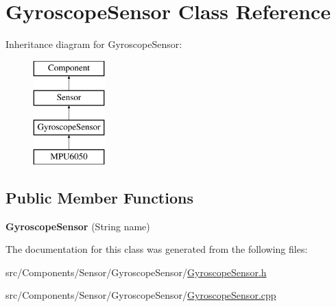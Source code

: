 \hypertarget{classGyroscopeSensor}{}\section{Gyroscope\+Sensor Class Reference}
\label{classGyroscopeSensor}
Inheritance diagram for Gyroscope\+Sensor\+:\begin{figure}[H]
\begin{center}
\leavevmode
\includegraphics[height=4.000000cm]{classGyroscopeSensor}
\end{center}
\end{figure}
\subsection*{Public Member Functions}
\begin{DoxyCompactItemize}
\item 
\hypertarget{classGyroscopeSensor_a5e0f1b0f3aecb4078fca1067055c0a7b}{}{\bfseries Gyroscope\+Sensor} (String name)\label{classGyroscopeSensor_a5e0f1b0f3aecb4078fca1067055c0a7b}

\end{DoxyCompactItemize}


The documentation for this class was generated from the following files\+:\begin{DoxyCompactItemize}
\item 
src/\+Components/\+Sensor/\+Gyroscope\+Sensor/\hyperlink{GyroscopeSensor_8h}{Gyroscope\+Sensor.\+h}\item 
src/\+Components/\+Sensor/\+Gyroscope\+Sensor/\hyperlink{GyroscopeSensor_8cpp}{Gyroscope\+Sensor.\+cpp}\end{DoxyCompactItemize}
